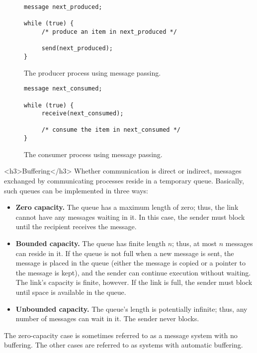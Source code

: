 \begin{figure}[h!]
\centering
\begin{verbatim}
message next_produced;
 
while (true) {
     /* produce an item in next_produced */
 
     send(next_produced);
}
\end{verbatim}
\caption{The producer process using message passing.}\label{fig:producer-message-passing}
\end{figure}

\begin{figure}[h!]
\centering
\begin{verbatim}
message next_consumed;
 
while (true) {
     receive(next_consumed);
 
     /* consume the item in next_consumed */
}
\end{verbatim}
\caption{The consumer process using message passing.}\label{fig:consumer-message-passing}
\end{figure}

<h3>Buffering</h3>
Whether communication is direct or indirect, messages exchanged by communicating processes reside in a temporary queue. Basically, such queues can be implemented in three ways:
\begin{itemize}
\item \textbf{Zero capacity.} The queue has a maximum length of zero; thus, the link cannot have any messages waiting in it. In this case, the sender must block until the recipient receives the message.
\item \textbf{Bounded capacity.} The queue has finite length $n$; thus, at most $n$ messages can reside in it. If the queue is not full when a new message is sent, the message is placed in the queue (either the message is copied or a pointer to the message is kept), and the sender can continue execution without waiting. The link's capacity is finite, however. If the link is full, the sender must block until space is available in the queue.
\item \textbf{Unbounded capacity.} The queue's length is potentially infinite; thus, any number of messages can wait in it. The sender never blocks.
\end{itemize}
The zero-capacity case is sometimes referred to as a message system with no buffering. The other cases are referred to as systems with automatic buffering.

